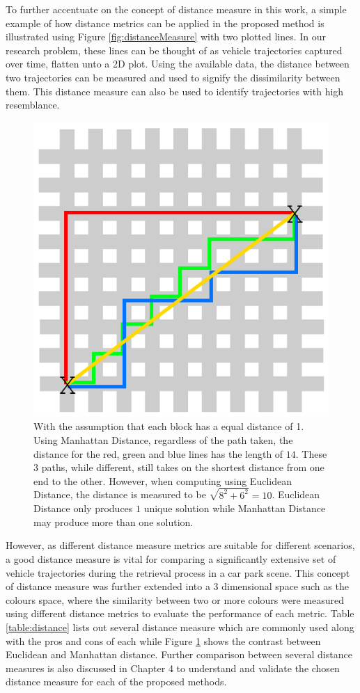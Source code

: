 To further accentuate on the concept of distance measure in this work, a simple
example of how distance metrics can be applied in the proposed method is
illustrated using Figure \ref{fig:distanceMeasure} with two plotted lines.
In our research problem, these lines can be thought of as vehicle
trajectories captured over time, flatten unto a 2D plot. Using the available
data, the distance between two trajectories can be measured and used to signify
the dissimilarity between them. This distance measure can also be used to
identify trajectories with high resemblance.


\begin{figure}[hbt!]
 \centering
 \includegraphics[width=.5\textwidth]{image/lit/manhattan.png}
 \caption[Comparison between Manhattan Distance vs. Euclidean Distance]{With
 the assumption that each block has a equal distance of 1. Using Manhattan
 Distance, regardless of the path taken, the distance for the red, green and
 blue lines has the length of $14$. These 3 paths, while different, still takes
 on the shortest distance from one end to the other. However, when computing
 using Euclidean Distance, the distance is measured to be $\sqrt{8^2+6^2} =
 10$. Euclidean Distance only produces $1$ unique solution while Manhattan
 Distance may produce more than one solution.}
 \label{fig:manhattan}
\end{figure}


However, as different distance measure metrics are suitable for different
scenarios, a good distance measure is vital for comparing a significantly
extensive set of vehicle trajectories during the retrieval process in a car park
scene. This concept of distance measure was further extended into a
3 dimensional space such as the colours space, where the similarity between
two or more colours were measured using different distance metrics to evaluate
the performance of each metric. Table \ref{table:distance} lists out several
distance measure which are commonly used along with the pros and cons of each
while Figure \ref{fig:manhattan} shows the contrast between Euclidean and
Manhattan distance. Further comparison between several distance measures is
also discussed in Chapter 4 to understand and validate the chosen distance
measure for each of the proposed methods.

